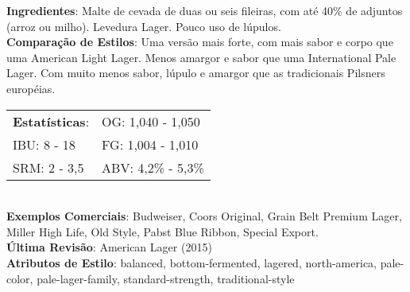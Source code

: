 \textbf{Ingredientes}: Malte de cevada de duas ou seis fileiras, com até 40\% de adjuntos (arroz ou milho). Levedura Lager. Pouco uso de lúpulos. \\
\textbf{Comparação de Estilos}: Uma versão mais forte, com mais sabor e corpo que uma American Light Lager. Menos amargor e sabor que uma International Pale Lager. Com muito menos sabor, lúpulo e amargor que as tradicionais Pilsners européias. \\
\begin{tabular}{@{}p{35mm}p{35mm}@{}}
  \textbf{Estatísticas}: & OG: 1,040 - 1,050 \\
  IBU: 8 - 18  & FG: 1,004 - 1,010 \\
  SRM: 2 - 3,5  & ABV: 4,2\% - 5,3\%
\end{tabular}\\
\textbf{Exemplos Comerciais}: Budweiser, Coors Original, Grain Belt Premium Lager, Miller High Life, Old Style, Pabst Blue Ribbon, Special Export. \\
\textbf{Última Revisão}: American Lager (2015) \\
\textbf{Atributos de Estilo}: balanced, bottom-fermented, lagered, north-america, pale-color, pale-lager-family, standard-strength, traditional-style
